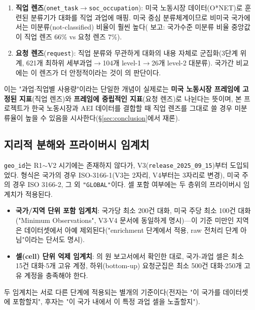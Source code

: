 \documentclass[11pt]{article}
\begin{document}
\begin{enumerate}[label=(\arabic*)]
  \item \textbf{직업 렌즈}(\texttt{onet\_task}$\to$\texttt{soc\_occupation}): 미국 노동시장 데이터(O*NET)로 훈련된 분류기가 대화를 직업 과업에 매핑. 미국 중심 분류체계이므로 비미국 국가에서는 미분류(not-classified) 비율이 훨씬 높다(\citealp{fan-2026-what-countries-use-ai-and} 보고: 국가수준 미분류 비율 중앙값이 직업 렌즈 66\% vs 요청 렌즈 7\%).
  \item \textbf{요청 렌즈}(\texttt{request}): 직업 분류와 무관하게 대화의 내용 자체로 군집화(3단계 위계, 621개 최하위 세부과업$\to$104개 level-1$\to$26개 level-2 대분류). 국가간 비교에는 이 렌즈가 더 안정적이라는 것이 \citet{fan-2026-what-countries-use-ai-and}의 판단이다.
\end{enumerate}

이는 "과업$\cdot$직업별 사용량"이라는 단일한 개념이 실제로는 \textbf{미국 노동시장 프레임에 고정된 지표}(직업 렌즈)와 \textbf{프레임에 중립적인 지표}(요청 렌즈)로 나뉜다는 뜻이며, 본 프로젝트가 한국 노동시장과 AEI 데이터를 결합할 때 직업 렌즈를 그대로 쓸 경우 미분류율이 높을 수 있음을 시사한다(\S\ref{sec:conclusion}에서 재론).

\subsection{지리적 분해와 프라이버시 임계치}

\texttt{geo\_id}는 R1$\sim$V2 시기에는 존재하지 않다가, V3(\texttt{release\_2025\_09\_15})부터 도입되었다. 형식은 국가의 경우 ISO-3166-1(V3는 2자리, V4부터는 3자리로 변경), 미국 주의 경우 ISO 3166-2, 그 외 \texttt{"GLOBAL"}이다. 셀 포함 여부에는 두 층위의 프라이버시 임계치가 적용된다.

\begin{itemize}[leftmargin=*]
  \item \textbf{국가/지역 단위 포함 임계치}: 국가당 최소 200건 대화, 미국 주당 최소 100건 대화("Minimum Observations", V3$\cdot$V4 문서에 동일하게 명시)---이 기준 미만인 지역은 데이터셋에서 아예 제외된다("enrichment 단계에서 적용, raw 전처리 단계 아님"이라는 단서도 명시).
  \item \textbf{셀(cell) 단위 억제 임계치}: \citet{appel-2025-uneven-geographic-and-enterprise-ai}의 원 보고서에서 확인한 대로, 국가-과업 셀은 최소 15건 대화$\cdot$5개 고유 계정, 하위(bottom-up) 요청군집은 최소 500건 대화$\cdot$250개 고유 계정을 충족해야 한다.
\end{itemize}

두 임계치는 서로 다른 단계에 적용되는 별개의 기준이다(전자는 "이 국가를 데이터셋에 포함할지", 후자는 "이 국가 내에서 이 특정 과업 셀을 노출할지").
\end{document}
